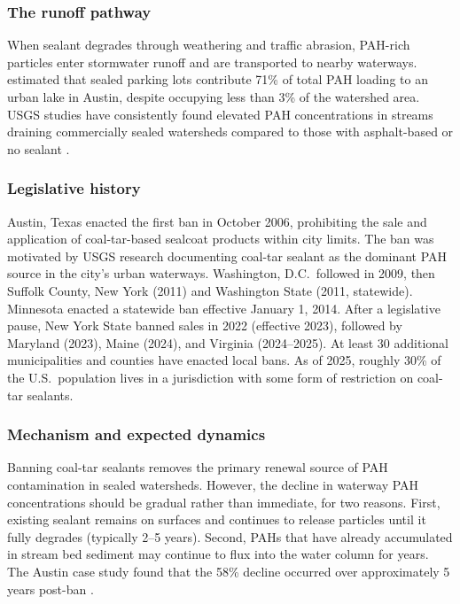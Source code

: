 \documentclass[12pt]{article}
\begin{document}
\subsubsection*{The runoff pathway} When sealant degrades through weathering and traffic abrasion, PAH-rich particles enter stormwater runoff and are transported to nearby waterways. \citet{vanmetre2009contribution} estimated that sealed parking lots contribute 71\% of total PAH loading to an urban lake in Austin, despite occupying less than 3\% of the watershed area. USGS studies have consistently found elevated PAH concentrations in streams draining commercially sealed watersheds compared to those with asphalt-based or no sealant \citep{mahler2005parking, mahler2012coal}.

\subsubsection*{Legislative history} Austin, Texas enacted the first ban in October 2006, prohibiting the sale and application of coal-tar-based sealcoat products within city limits. The ban was motivated by USGS research documenting coal-tar sealant as the dominant PAH source in the city's urban waterways. Washington, D.C.\ followed in 2009, then Suffolk County, New York (2011) and Washington State (2011, statewide). Minnesota enacted a statewide ban effective January 1, 2014. After a legislative pause, New York State banned sales in 2022 (effective 2023), followed by Maryland (2023), Maine (2024), and Virginia (2024--2025). At least 30 additional municipalities and counties have enacted local bans. As of 2025, roughly 30\% of the U.S.\ population lives in a jurisdiction with some form of restriction on coal-tar sealants.

\subsubsection*{Mechanism and expected dynamics} Banning coal-tar sealants removes the primary renewal source of PAH contamination in sealed watersheds. However, the decline in waterway PAH concentrations should be gradual rather than immediate, for two reasons. First, existing sealant remains on surfaces and continues to release particles until it fully degrades (typically 2--5 years). Second, PAHs that have already accumulated in stream bed sediment may continue to flux into the water column for years. The Austin case study found that the 58\% decline occurred over approximately 5 years post-ban \citep{vanmetre2014decline}.
\end{document}
